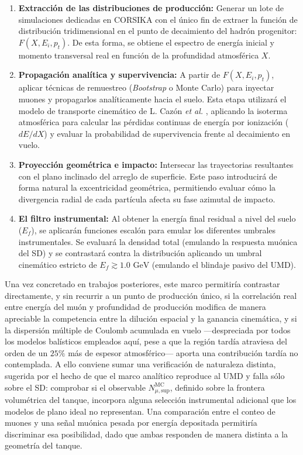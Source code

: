 \begin{enumerate}
	\item \textbf{Extracción de las distribuciones de producción:} Generar un lote de simulaciones dedicadas en CORSIKA con el único fin de extraer la función de distribución tridimensional en el punto de decaimiento del hadrón progenitor: $F(X, E_i, p_t)$. De esta forma, se obtiene el espectro de energía inicial y momento transversal real en función de la profundidad atmosférica $X$.
	
	\item \textbf{Propagación analítica y supervivencia:} A partir de $F(X, E_i, p_t)$, aplicar técnicas de remuestreo (\textit{Bootstrap} o Monte Carlo) para inyectar muones y propagarlos analíticamente hacia el suelo. Esta etapa utilizará el modelo de transporte cinemático de L. Cazón \textit{et al.} \cite{Cazon2012}, aplicando la isoterma atmosférica para calcular las pérdidas continuas de energía por ionización ($dE/dX$) y evaluar la probabilidad de supervivencia frente al decaimiento en vuelo.
	
	\item \textbf{Proyección geométrica e impacto:} Intersecar las trayectorias resultantes con el plano inclinado del arreglo de superficie. Este paso introducirá de forma natural la excentricidad geométrica, permitiendo evaluar cómo la divergencia radial de cada partícula afecta su fase azimutal de impacto.
	
	\item \textbf{El filtro instrumental:} Al obtener la energía final residual a nivel del suelo ($E_f$), se aplicarán funciones escalón para emular los diferentes umbrales instrumentales. Se evaluará la densidad total (emulando la respuesta muónica del SD) y se contrastará contra la distribución aplicando un umbral cinemático estricto de $E_f \gtrsim 1.0\text{ GeV}$ (emulando el blindaje pasivo del UMD).
\end{enumerate}

Una vez concretado en trabajos posteriores, este marco permitiría contrastar directamente, y sin recurrir a un punto de producción único, si la correlación real entre energía del muón y profundidad de producción \cite{Cazon2012} modifica de manera apreciable la competencia entre la dilución espacial y la ganancia cinemática, y si la dispersión múltiple de Coulomb acumulada en vuelo —despreciada por todos los modelos balísticos empleados aquí, pese a que la región tardía atraviesa del orden de un $25\%$ más de espesor atmosférico— aporta una contribución tardía no contemplada. A ello conviene sumar una verificación de naturaleza distinta, sugerida por el hecho de que el marco analítico reproduce al UMD y falla sólo sobre el SD: comprobar si el observable $N_{\mu,\mathrm{sup}}^{\mathrm{MC}}$, definido sobre la frontera volumétrica del tanque, incorpora alguna selección instrumental adicional que los modelos de plano ideal no representan. Una comparación entre el conteo de muones y una señal muónica pesada por energía depositada permitiría discriminar esa posibilidad, dado que ambas responden de manera distinta a la geometría del tanque.

